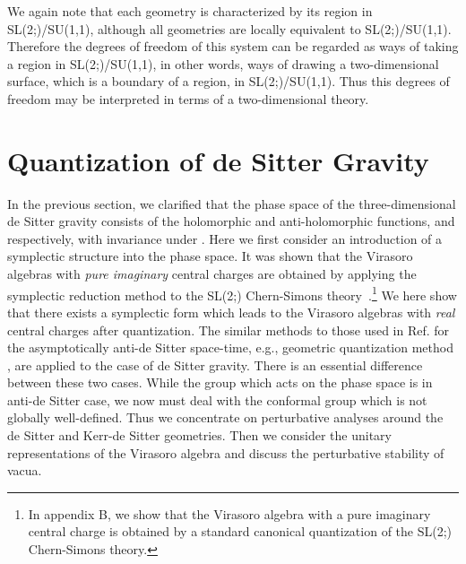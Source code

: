 \documentclass[a4paper,11pt]{article}
\begin{document}
We again note that each geometry is characterized by its region in 
SL(2;\coordHE{})/SU(1,1), although all geometries are locally 
equivalent to SL(2;\coordHE{})/SU(1,1). 
Therefore the degrees of freedom of this system can be regarded as 
ways of taking a region in SL(2;\coordHE{})/SU(1,1), in other words, 
ways of drawing a two-dimensional surface, which is a boundary of 
a region, in SL(2;\coordHE{})/SU(1,1).
Thus this degrees of freedom may be interpreted in terms of
a two-dimensional theory.


\section{Quantization of de Sitter Gravity}
In the previous section, we clarified that the phase space  
of the three-dimensional de Sitter gravity consists of the holomorphic 
and anti-holomorphic functions, 
\coordHE{} and \coordHE{} respectively, with invariance 
under \coordHE{}.
Here we first consider an introduction of a symplectic structure 
into the phase space.
It was shown that the Virasoro algebras with {\it pure imaginary} 
central charges are obtained by applying the symplectic reduction method 
to the SL(2;\coordHE{}) Chern-Simons theory~\cite{Park}.\footnote{
In appendix B, we show that the Virasoro algebra with a pure imaginary central
charge is obtained by a standard canonical quantization of 
the SL(2;\coordHE{})
Chern-Simons theory.}
We here show that there exists a symplectic form which leads to 
the Virasoro algebras with {\it real} central charges after
quantization.
The similar methods to those used in Ref.\cite{NUY} for the asymptotically 
anti-de Sitter space-time, 
e.g., geometric quantization method \cite{Segal, B-R, Witten3, Woodhouse}, 
are applied to the case of de Sitter gravity.
There is an essential difference between these two cases.
While the group which acts on the phase space is \coordHE{} 
in anti-de Sitter case, we now must deal with 
the conformal group which is not globally well-defined.
Thus we concentrate on perturbative analyses around the de Sitter and 
Kerr-de Sitter geometries.
Then we consider the unitary representations of the Virasoro algebra 
and discuss the perturbative stability of vacua. 
\end{document}
